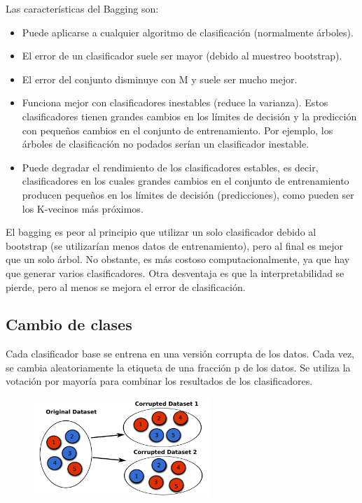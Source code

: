 Las características del Bagging son:
\begin{itemize}
\item Puede aplicarse a cualquier algoritmo de clasificación (normalmente árboles).
\item El error de un clasificador suele ser mayor (debido al muestreo bootstrap).
\item El error del conjunto disminuye con M y suele ser mucho mejor.
\item Funciona mejor con clasificadores inestables (reduce la varianza). Estos clasificadores tienen grandes cambios en los límites de decisión y la predicción con pequeños cambios en el conjunto de entrenamiento. Por ejemplo, los árboles de clasificación no podados serían un clasificador inestable.
\item Puede degradar el rendimiento de los clasificadores estables, es decir, clasificadores en los cuales grandes cambios en el conjunto de entrenamiento producen pequeños en los límites de decisión (predicciones), como pueden ser los K-vecinos más próximos.
\end{itemize}

El bagging es peor al principio que utilizar un solo clasificador debido al bootstrap (se utilizarían menos datos de entrenamiento), pero al final es mejor que un solo árbol. No obstante, es más costoso computacionalmente, ya que hay que generar varios clasificadores. Otra desventaja es que la interpretabilidad se pierde, pero al menos se mejora el error de clasificación. 

\subsection{Cambio de clases}
Cada clasificador base se entrena en una versión corrupta de los datos. Cada vez, se cambia aleatoriamente la etiqueta de una fracción p de los datos. Se utiliza la votación por mayoría para combinar los resultados de los clasificadores.

\begin{figure}[h]
\centering
\includegraphics[width = 0.6\textwidth]{figs/class-switching.png}
\end{figure}


